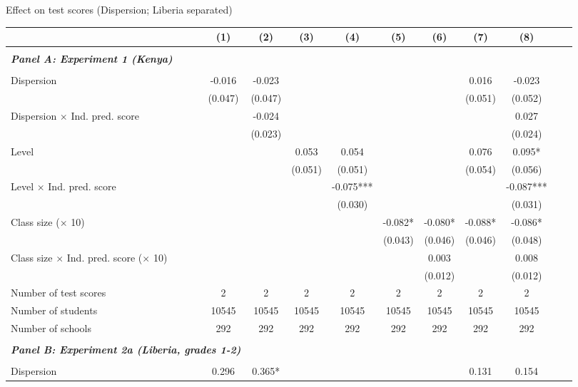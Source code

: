 \begin{center} 
\caption{\small Effect on test scores (Dispersion; Liberia separated)} 
\label{tab:descriptives} 
\begin{scriptsize}
\begin{threeparttable}
\begin{tabular} {@{} l l c c c c c c c c c c  @{}} \toprule \toprule
& &(1)&(2)&(3)&(4)&(5)&(6)&(7)&(8) \\ \midrule 
\\
\multicolumn{3}{l}{\textbf{\textit{Panel A: Experiment 1 (Kenya)}}} \\
\\
Dispersion &  & -0.016 & -0.023 &  &  &  &  & 0.016 & -0.023 \\
                 &  & (0.047) & (0.047) &  &  &  &  & (0.051) & (0.052) \\
Dispersion $\times$ Ind. pred. score &  &  & -0.024 &  &  &  &  &  & 0.027 \\
                 &  &  & (0.023) &  &  &  &  &  & (0.024) \\
Level &  &  &  & 0.053 & 0.054 &  &  & 0.076 & 0.095* \\
                 &  &  &  & (0.051) & (0.051) &  &  & (0.054) & (0.056) \\
Level $\times$ Ind. pred. score &  &  &  &  & -0.075*** &  &  &  & -0.087*** \\
                 &  &  &  &  & (0.030) &  &  &  & (0.031) \\
Class size ($\times$ 10) &  &  &  &  &  & -0.082* & -0.080* & -0.088* & -0.086* \\
                 &  &  &  &  &  & (0.043) & (0.046) & (0.046) & (0.048) \\
Class size $\times$ Ind. pred. score ($\times$ 10) &  &  &  &  &  &  & 0.003 &  & 0.008 \\
                 &  &  &  &  &  &  & (0.012) &  & (0.012) \\
\midrule
Number of test scores &  & 2 & 2 & 2 & 2 & 2 & 2 & 2 & 2 \\
Number of students &  & 10545 & 10545 & 10545 & 10545 & 10545 & 10545 & 10545 & 10545 \\
Number of schools &  & 292 & 292 & 292 & 292 & 292 & 292 & 292 & 292 \\
 \midrule
\\
\multicolumn{3}{l}{\textbf{\textit{Panel B: Experiment 2a (Liberia, grades 1-2)}}} \\
\\
Dispersion &  & 0.296 & 0.365* &  &  &  &  & 0.131 & 0.154 \\

\end{tabular}
\end{threeparttable}
\end{scriptsize}
\end{center}
